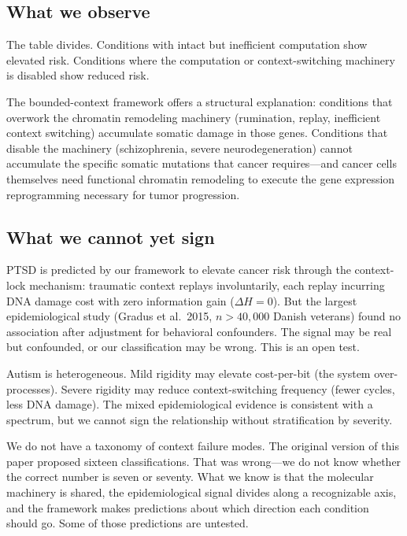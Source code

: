 \documentclass[11pt]{article}
\theoremstyle{definition}
\begin{document}
\subsection{What we observe}

The table divides. Conditions with intact but inefficient
computation show elevated risk. Conditions where the computation
or context-switching machinery is disabled show reduced risk.

The bounded-context framework offers a structural explanation:
conditions that overwork the chromatin remodeling machinery
(rumination, replay, inefficient context switching) accumulate
somatic damage in those genes. Conditions that disable the
machinery (schizophrenia, severe neurodegeneration) cannot
accumulate the specific somatic mutations that cancer requires---and
cancer cells themselves need functional chromatin remodeling
to execute the gene expression reprogramming necessary for
tumor progression.

\subsection{What we cannot yet sign}

PTSD is predicted by our framework to elevate cancer risk
through the context-lock mechanism: traumatic context replays
involuntarily, each replay incurring DNA damage cost with
zero information gain ($\Delta H = 0$). But the largest
epidemiological study (Gradus et al.\ 2015, $n > 40{,}000$
Danish veterans) found no association after adjustment for
behavioral confounders. The signal may be real but confounded,
or our classification may be wrong. This is an open test.

Autism is heterogeneous. Mild rigidity may elevate cost-per-bit
(the system over-processes). Severe rigidity may reduce
context-switching frequency (fewer cycles, less DNA damage).
The mixed epidemiological evidence \cite{Darbro2016} is
consistent with a spectrum, but we cannot sign the relationship
without stratification by severity.

We do not have a taxonomy of context failure modes. The original
version of this paper proposed sixteen classifications. That was
wrong---we do not know whether the correct number is seven or
seventy. What we know is that the molecular machinery is shared,
the epidemiological signal divides along a recognizable axis,
and the framework makes predictions about which direction each
condition should go. Some of those predictions are untested.
\end{document}
